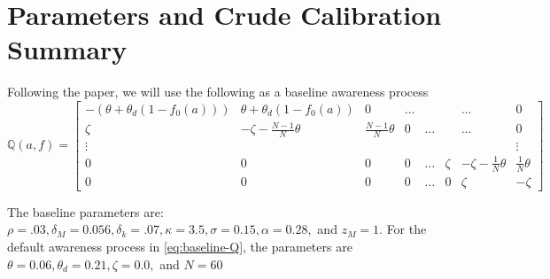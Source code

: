 \documentclass[12pt]{article}
\newcommand{\Q}[0]{\ensuremath{\mathbb{Q}}}
\begin{document}
\section{Parameters and Crude Calibration Summary}\label{sec:calibration}

Following the paper, we will use the following as a baseline awareness process
\begin{equation}
	\Q(a, f) = \begin{bmatrix}
	-\left(\theta + \theta_d (1 - f_0(a))\right) & \theta + \theta_d (1 - f_0(a)) & 0 & \ldots & & & \ldots & 0\\
	\zeta  & -\zeta - \tfrac{N-1}{N}\theta & \tfrac{N-1}{N}\theta & 0 & \ldots & & \ldots & 0\\
	\vdots & & & & & & & \vdots\\ %
	0 & 0 & 0 & 0 & \ldots &\zeta & -\zeta -\tfrac{1}{N}\theta & \tfrac{1}{N}\theta\\
	0 & 0 & 0 & 0 & \ldots & 0 & \zeta & -\zeta
	\end{bmatrix}\label{eq:baseline-Q}
\end{equation}

The baseline parameters are: $\rho = .03, \delta_M = 0.056, \delta_k = .07, \kappa = 3.5, \sigma = 0.15, \alpha = 0.28,$ and $z_M = 1$.  For the default awareness process in \cref{eq:baseline-Q}, the parameters are $\theta = 0.06, \theta_d = 0.21, \zeta = 0.0,$ and $N = 60$
\end{document}
